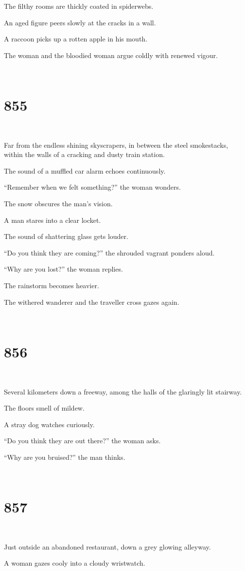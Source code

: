 \documentclass{report}
\begin{document}
The filthy rooms are thickly coated in spiderwebs.

An aged figure peers slowly at the cracks in a wall.

A raccoon picks up a rotten apple in his mouth.

The woman and the bloodied woman argue coldly with renewed vigour.

~
\chapter*{855}
~

Far from the endless shining skyscrapers, in between the steel smokestacks, within the walls of a cracking and dusty train station.

The sound of a muffled car alarm echoes continuously.

``Remember when we felt something?'' the woman wonders.

The snow obscures the man's vision.

A man stares into a clear locket.

The sound of shattering glass gets louder.

``Do you think they are coming?'' the shrouded vagrant ponders aloud.

``Why are you lost?'' the woman replies.

The rainstorm becomes heavier.

The withered wanderer and the traveller cross gazes again.

~
\chapter*{856}
~

Several kilometers down a freeway, among the halls of the glaringly lit stairway.

The floors smell of mildew.

A stray dog watches curiously.

``Do you think they are out there?'' the woman asks.

``Why are you bruised?'' the man thinks.

~
\chapter*{857}
~

Just outside an abandoned restaurant, down a grey glowing alleyway.

A woman gazes cooly into a cloudy wristwatch.
\end{document}

